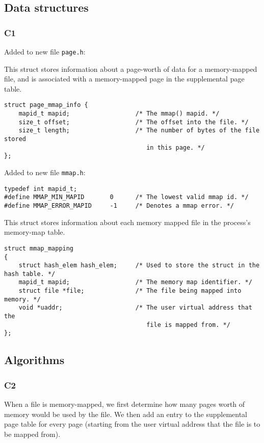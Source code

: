 \documentclass[a4wide, 11pt]{article}
\newcommand{\tx}{\texttt}
\begin{document}
\subsection{Data structures}
\subsubsection{C1}
Added to new file \tx{page.h}:

This struct stores information about a page-worth of data for a memory-mapped file, and is associated with a memory-mapped page in the supplemental page table.
\begin{verbatim}
struct page_mmap_info {
    mapid_t mapid;                  /* The mmap() mapid. */
    size_t offset;                  /* The offset into the file. */
    size_t length;                  /* The number of bytes of the file stored
                                       in this page. */
};
\end{verbatim}

Added to new file \tx{mmap.h}:
\begin{verbatim}
typedef int mapid_t;
#define MMAP_MIN_MAPID       0      /* The lowest valid mmap id. */
#define MMAP_ERROR_MAPID     -1     /* Denotes a mmap error. */
\end{verbatim}

This struct stores information about each memory mapped file in the process's memory-map table.
\begin{verbatim}
struct mmap_mapping
{
    struct hash_elem hash_elem;     /* Used to store the struct in the hash table. */
    mapid_t mapid;                  /* The memory map identifier. */
    struct file *file;              /* The file being mapped into memory. */
    void *uaddr;                    /* The user virtual address that the
                                       file is mapped from. */
};
\end{verbatim}

\subsection{Algorithms}
\subsubsection{C2}

When a file is memory-mapped, we first determine how many pages worth of memory would be used by the file. We then add an entry to the supplemental page table for every page (starting from the user virtual address that the file is to be mapped from).
\end{document}

